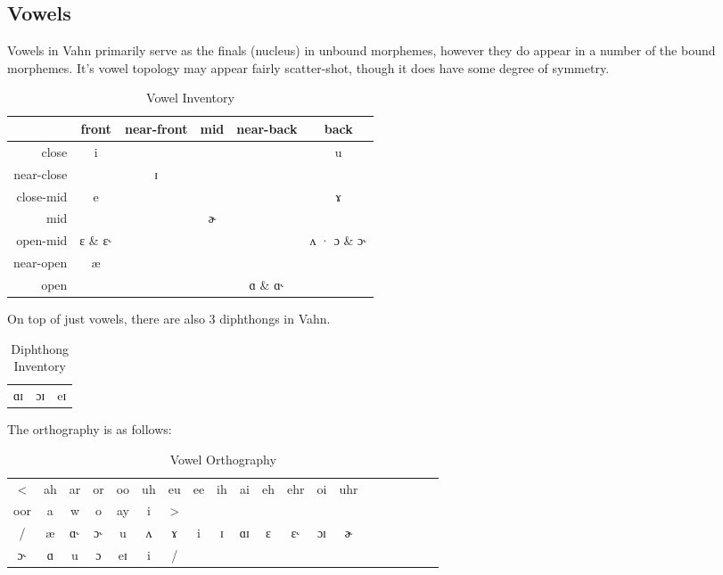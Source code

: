 \documentclass{article}
\begin{document}
\subsection{Vowels}

Vowels in Vahn primarily serve as the finals (nucleus) in unbound morphemes, however they do appear in a number of the bound morphemes. It's vowel topology may appear fairly scatter-shot, though it does have some degree of symmetry.

\begin{table}[H]
\centering
\begin{tabular}{r|ccccc}
& front & near-front & mid & near-back & back \\
\hline
close & i & & & & u \\
near-close & & ɪ & & & \\
close-mid & e & & & & ɤ \\
mid & & & ɚ & & \\
open-mid & ɛ \& ɛ˞ & & & & ʌ · ɔ \& ɔ˞ \\
near-open & æ & & & & \\
open & & & & ɑ \& ɑ˞ & \\
\end{tabular}
\caption{Vowel Inventory}
\label{Vowel Inventory}
\end{table}

On top of just vowels, there are also 3 diphthongs in Vahn.

\begin{table}[H]
\centering
\begin{tabular}{c|c|c}
ɑɪ & ɔɪ & eɪ
\end{tabular}
\caption{Diphthong Inventory}
\label{Diphthong Inventory}
\end{table}

\noindent The orthography is as follows:

\begin{table}[H]
\centering
\begin{tabular}{cccccccccccccccccccc}
< & ah & ar & or & oo & uh & eu & ee & ih & ai & eh & ehr & oi & uhr \\
oor & a & w & o & ay & i & >\\
/ & æ & ɑ˞ & ɔ˞ & u & ʌ & ɤ & i & ɪ & ɑɪ & ɛ & ɛ˞ & ɔɪ & ɚ & \\
ɔ˞ & ɑ & u & ɔ & eɪ & i& /
\end{tabular}
\caption{Vowel Orthography}
\label{Vowel Orthography}
\end{table}

\newpage
\end{document}
